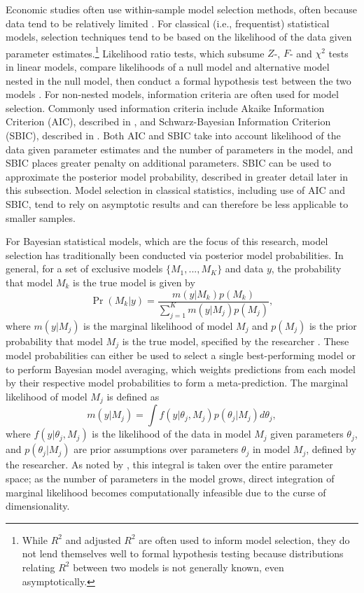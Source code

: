 \documentclass[twocolumn]{article}
\begin{document}
Economic studies often use within-sample model selection methods, often because data tend to be relatively limited \citep{Greene}. For classical (i.e., frequentist) statistical models, selection techniques tend to be based on the likelihood of the data given parameter estimates.\footnote{While $R^2$ and adjusted $R^2$ are often used to inform model selection, they do not lend themselves well to formal hypothesis testing because distributions relating $R^2$ between two models is not generally known, even asymptotically.} Likelihood ratio tests, which subsume $Z$-, $F$- and $\chi^2$ tests in linear models, compare likelihoods of a null model and alternative model nested in the null model, then conduct a formal hypothesis test between the two models \citep{Morgan}. For non-nested models, information criteria are often used for model selection. Commonly used information criteria include Akaike Information Criterion (AIC), described in \cite{Akaike}, and Schwarz-Bayesian Information Criterion (SBIC), described in \cite{Schwarz}. Both AIC and SBIC take into account likelihood of the data given parameter estimates and the number of parameters in the model, and SBIC places greater penalty on additional parameters. SBIC can be used to approximate the posterior model probability, described in greater detail later in this subsection. Model selection in classical statistics, including use of AIC and SBIC, tend to rely on asymptotic results and can therefore be less applicable to smaller samples.

For Bayesian statistical models, which are the focus of this research, model selection has traditionally been conducted via posterior model probabilities. In general, for a set of exclusive models $\{M_1, ..., M_K\}$ and data $y$, the probability that model $M_k$ is the true model is given by
\begin{equation}
	\Pr(M_k|y) = \frac{m(y|M_k)p(M_k)}{\sum_{j=1}^K m(y|M_j)p(M_j)},
\end{equation}
where $m(y|M_j)$ is the marginal likelihood of model $M_j$ and $p(M_j)$ is the prior probability that model $M_j$ is the true model, specified by the researcher \citep{KassRaftery}. These model probabilities can either be used to select a single best-performing model or to perform Bayesian model averaging, which weights predictions from each model by their respective model probabilities to form a meta-prediction. The marginal likelihood of model $M_j$ is defined as
\begin{equation}
m(y|M_j) = \int f(y|\theta_j, M_j) p(\theta_j|M_j)d\theta_j,
\end{equation}
where $f(y|\theta_j, M_j)$ is the likelihood of the data in model $M_j$ given parameters $\theta_j$, and $p(\theta_j|M_j)$ are prior assumptions over parameters $\theta_j$ in model $M_j$, defined by the researcher. As noted by \cite{KassRaftery}, this integral is taken over the entire parameter space; as the number of parameters in the model grows, direct integration of marginal likelihood becomes computationally infeasible due to the curse of dimensionality.
\end{document}
